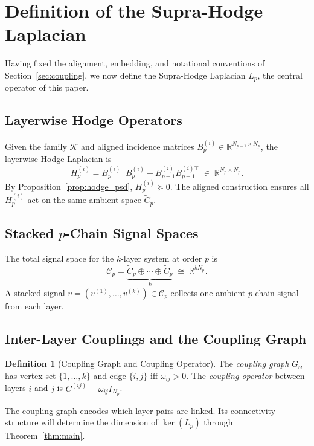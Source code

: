\documentclass[11pt]{article}
\theoremstyle{definition}
\newtheorem{definition}[theorem]{Definition}
\theoremstyle{remark}
\newcommand{\R}{\mathbb{R}}
\newcommand{\Ctil}{\widetilde{C}}
\newcommand{\Gom}{G_\omega}
\newcommand{\calK}{\mathcal{K}}
\newcommand{\calC}{\mathcal{C}}
\begin{document}
\section{Definition of the Supra-Hodge Laplacian}
\label{sec:defn}

Having fixed the alignment, embedding, and notational conventions of
Section~\ref{sec:coupling}, we now define the Supra-Hodge Laplacian $L_p$, the
central operator of this paper.

\subsection{Layerwise Hodge Operators}

Given the family $\calK$ and aligned incidence matrices $B_p^{(i)}\in
\R^{N_{p-1}\times N_p}$, the layerwise Hodge Laplacian is
\[
  H_p^{(i)} = B_p^{(i)\top}B_p^{(i)} + B_{p+1}^{(i)}B_{p+1}^{(i)\top}
  \;\in\; \R^{N_p\times N_p}.
\]
By Proposition~\ref{prop:hodge_psd}, $H_p^{(i)}\succeq 0$. The aligned
construction ensures all $H_p^{(i)}$ act on the same ambient space $\Ctil_p$.

\subsection{\texorpdfstring{Stacked $p$-Chain Signal Spaces}{Stacked p-Chain Signal Spaces}}

The total signal space for the $k$-layer system at order $p$ is
\[
  \calC_p = \underbrace{\Ctil_p \oplus \cdots \oplus \Ctil_p}_{k}
  \;\cong\; \R^{kN_p}.
\]
A stacked signal $v=(v^{(1)},\dots,v^{(k)})\in\calC_p$ collects one ambient
$p$-chain signal from each layer.

\subsection{Inter-Layer Couplings and the Coupling Graph}

\begin{definition}[Coupling Graph and Coupling Operator]
The \emph{coupling graph} $\Gom$ has vertex set $\{1,\dots,k\}$ and edge
$\{i,j\}$ iff $\omega_{ij}>0$. The \emph{coupling operator} between layers $i$
and $j$ is $C^{(ij)}=\omega_{ij}I_{N_p}$.
\end{definition}

The coupling graph encodes which layer pairs are linked. Its connectivity
structure will determine the dimension of $\ker(L_p)$ through
Theorem~\ref{thm:main}.
\end{document}
